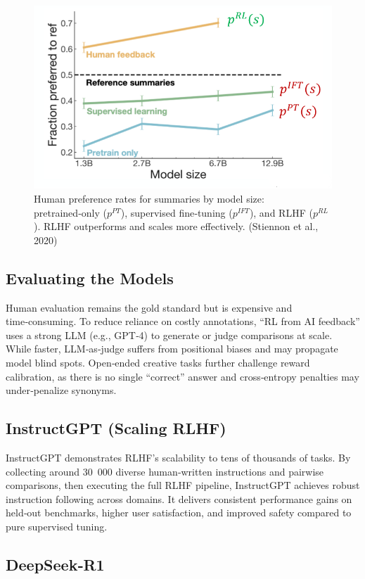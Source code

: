 \documentclass{article}
\begin{document}
\begin{figure}[ht]
    \centering
    \includegraphics[width=0.65\linewidth]{graphics/S11RLHF/performance_rlhf.png}
    \caption{Human preference rates for summaries by model size: pretrained‑only (\(p^{PT}\)), supervised fine‑tuning (\(p^{IFT}\)), and RLHF (\(p^{RL}\)). RLHF outperforms and scales more effectively. (Stiennon et al., 2020)}
    \label{fig:performance-rlhf}
\end{figure}

\subsection{Evaluating the Models}

Human evaluation remains the gold standard but is expensive and time‑consuming. To reduce reliance on costly annotations, “RL from AI feedback” uses a strong LLM (e.g., GPT‑4) to generate or judge comparisons at scale. While faster, LLM‑as‑judge suffers from positional biases and may propagate model blind spots. Open‑ended creative tasks further challenge reward calibration, as there is no single “correct” answer and cross‑entropy penalties may under‑penalize synonyms.

\subsection{InstructGPT (Scaling RLHF)}

InstructGPT demonstrates RLHF’s scalability to tens of thousands of tasks. By collecting around 30 000 diverse human‑written instructions and pairwise comparisons, then executing the full RLHF pipeline, InstructGPT achieves robust instruction following across domains. It delivers consistent performance gains on held‑out benchmarks, higher user satisfaction, and improved safety compared to pure supervised tuning.

\subsection{DeepSeek‑R1}
\end{document}
